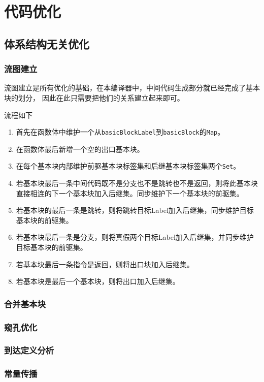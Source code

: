 \chapter{代码优化}
\section{体系结构无关优化}

\subsection{流图建立}
流图建立是所有优化的基础，在本编译器中，中间代码生成部分就已经完成了基本块的划分，
因此在此只需要把他们的关系建立起来即可。

流程如下
\begin{enumerate}
    \item 首先在函数体中维护一个从\texttt{basicBlockLabel}到\texttt{basicBlock}的\texttt{Map}。
    \item 在函数体最后新增一个空的出口基本块。
    \item 在每个基本块内部维护前驱基本块标签集和后继基本块标签集两个\texttt{Set}。
    \item 若基本块最后一条中间代码既不是分支也不是跳转也不是返回，则将此基本块直接相连的下一个基本块加入后继集。同步维护下一个基本块的前驱集。
    \item 若基本块的最后一条是跳转，则将跳转目标Label加入后继集，同步维护目标基本块的前驱集。
    \item 若基本块最后一条是分支，则将真假两个目标Label加入后继集，并同步维护目标基本块的前驱集。
    \item 若基本块最后一条指令是返回，则将出口块加入后继集。
    \item 若基本块是最后一个基本块，则将出口加入后继集。
\end{enumerate}

\subsection{合并基本块}

\subsection{窥孔优化}

\subsection{到达定义分析}

\subsection{常量传播}

